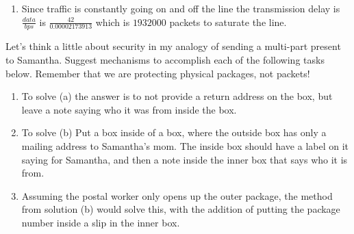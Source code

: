 \documentclass[12pt,addpoints,answers]{exam}
\begin{document}
\begin{questions}
\begin{solution}
\begin{enumerate}
		\item Since traffic is constantly going on and off the line the transmission delay is $\frac{data}{bps}$ is $\frac{42}{0.00002173913}$ which is $1932000$ packets to saturate the line.
	\end{enumerate}
\end{solution}

\question Let's think a little about security in my analogy of sending a multi-part present to Samantha. Suggest mechanisms to accomplish each of the following tasks below. Remember that we are protecting physical packages, not packets!
\begin{solution}
	\begin{enumerate}
		\item To solve (a) the answer is to not provide a return address on the box, but leave a note saying who it was from inside the box.
		
		\item To solve (b) Put a box inside of a box, where the outside box has only a mailing address to Samantha's mom.  The inside box should have a label on it saying for Samantha, and then a note inside the inner box that says who it is from.
		
		\item Assuming the postal worker only opens up the outer package, the method from solution (b) would solve this, with the addition of putting the package number inside a slip in the inner box.
	\end{enumerate}
\end{solution}


\end{questions}
\end{document}
